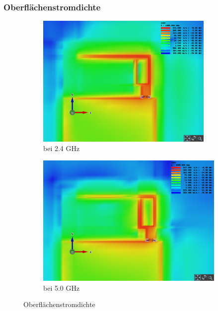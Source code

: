 \subsubsection{Oberflächenstromdichte}
\begin{figure}[htbp]
	\begin{center}
		\begin{subfigure}[t]{0.49\textwidth}
			\begin{center}
				\includegraphics[width=0.94\textwidth]{../fig/plt/crazy_stuff_l4_pcb_v2c_laptop_1a_105_2ghz4_3d_surface_current_density_xy.png}
				\caption{bei 2.4 GHz}
				\label{fig:currentdensity_2_4}
			\end{center}
		\end{subfigure}
		\begin{subfigure}[t]{0.49\textwidth}
			\begin{center}
				\includegraphics[width=1\textwidth]{../fig/plt/crazy_stuff_l4_pcb_v2c_laptop_1a_105_5ghz_3d_surface_current_density_xy.png}
				\caption{bei 5.0 GHz}
				\label{fig:currentdensity_5_0}
			\end{center}
		\end{subfigure}
		\caption{Oberflächenstromdichte}
		\label{fig:currentdensity}
	\end{center}
\end{figure}


